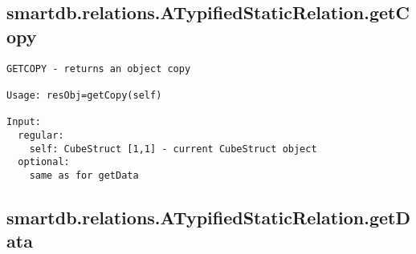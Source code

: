 \subsection{\texorpdfstring{smartdb.relations.ATypifiedStaticRelation.getCopy}{getCopy}}\label{method:smartdb.relations.ATypifiedStaticRelation.getCopy}
\begin{verbatim}
GETCOPY - returns an object copy

Usage: resObj=getCopy(self)

Input:
  regular:
    self: CubeStruct [1,1] - current CubeStruct object
  optional:
    same as for getData
\end{verbatim}
\subsection{\texorpdfstring{smartdb.relations.ATypifiedStaticRelation.getData}{getData}}\label{method:smartdb.relations.ATypifiedStaticRelation.getData}
